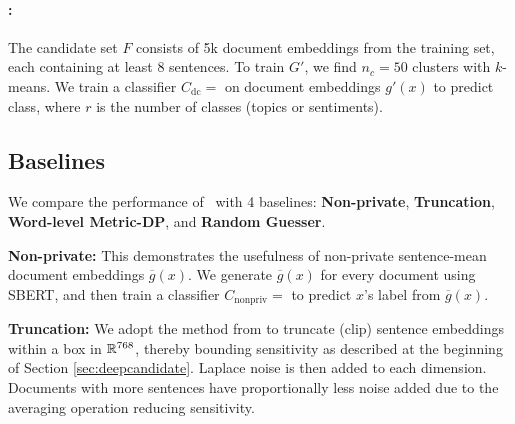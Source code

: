 \paragraph{\technique:} The candidate set $F$ consists of 5k document embeddings from the training set, each containing at least 8 sentences. To train $G'$, we find $n_c = 50$ clusters with $k$-means. We train a classifier $C_{\text{dc}} = $  on document embeddings $g'(x)$ to predict class, where $r$ is the number of classes (topics or sentiments). 

\subsection{Baselines}
We compare the performance of \technique\ with 4 baselines: \textbf{Non-private}, \textbf{Truncation}, \textbf{Word-level Metric-DP}, and \textbf{Random Guesser}. 

\textbf{Non-private:} This demonstrates the usefulness of non-private sentence-mean document embeddings $\overline{g}(x)$. We generate $\overline{g}(x)$ for every document using SBERT, and then train a classifier $C_{\text{nonpriv}} = $  to predict $x$'s label from $\overline{g}(x)$. 

\textbf{Truncation:} We adopt the method from \citealt{clifton} to truncate (clip) sentence embeddings within a box in ${\mathbb R}^{768}$, thereby bounding sensitivity as described at the beginning of Section \ref{sec:deepcandidate}. Laplace noise is then added to each dimension. Documents with more sentences have proportionally less noise added due to the averaging operation reducing sensitivity. 


